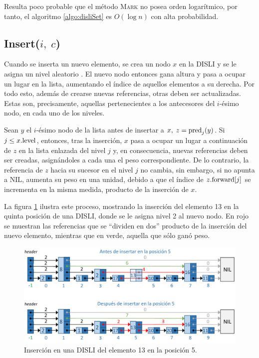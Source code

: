 \documentclass[a4paper,10pt,twocolumn]{article}
\newcommand{\pred}[1]{{\rm pred}_{#1}} %
\newcommand{\fwd}[1]{{\rm forward}[#1]}
\newcommand{\lev}{{\rm level}}
\newcommand{\disliWUpRef}[1]{{\color{disliWUpRef}#1}}
\begin{document}
  Resulta poco probable que el método \textsc{Mark}  no posea orden logarítmico, por tanto, el algoritmo \ref{algo:disliSet} es $ O(\log n) $ con alta probabilidad.
  
\subsection{Insert($ i,\; c $)}\label{subsec:disliInsert}
  Cuando se inserta un nuevo elemento, se crea un nodo $ x $ en la DISLI y se le asigna un nivel aleatorio \cite{Pugh}. El nuevo nodo entonces gana altura y pasa a ocupar un lugar en la lista, aumentando el índice de aquellos elementos a su derecha. Por todo esto, además de crearse nuevas referencias, otras deben ser actualizadas. Estas son, precisamente, aquellas pertenecientes a los antecesores del $ i $-ésimo nodo, en cada uno de los niveles. 
  
  Sean $ y $ el $ i $-ésimo nodo de la lista antes de insertar a $ x, \; z = \pred{j}(y) $. Si $ j \leq x . \lev $, entonces, tras la inserción, $ x $ pasa a ocupar un lugar a continuación de $ z $ en la lista enlazada del nivel $ j $ y, en consecuencia, nuevas referencias deben ser creadas, asignándoles a cada una el peso correspondiente. De lo contrario, la referencia de $ z $ hacia su sucesor en el nivel $ j $ no cambia, sin embargo, si no apunta a NIL, aumenta su peso en una unidad, debido a que el índice de $ z . \fwd{j} $ se incrementa en la misma medida, producto de la inserción de $ x $.
  
  La figura \ref{fig:disliInsertion} ilustra este proceso, mostrando la inserción del elemento 13 en la quinta posición de una DISLI, donde se le asigna nivel 2 al nuevo nodo. En {\red rojo} se muestran las referencias que se ``dividen en dos'' producto de la inserción del nuevo elemento, mientras que en \disliWUpRef{verde}, aquella que sólo ganó peso.
  \begin{figure}[htb]
  	\hspace{-1.5cm}
  	\includegraphics[scale=.5]{Graphics/DISLI_insertion.pdf}
  	\caption{Inserción en una DISLI del elemento 13 en la posición 5.}\label{fig:disliInsertion}
  \end{figure}
\end{document}
